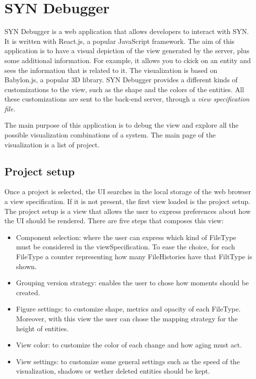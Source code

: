 \section{SYN Debugger}

SYN Debugger is a web application that allows developers to interact with SYN. It is written with React.js, a popular JavaScript framework. 
The aim of this application is to have a visual depiction of the view generated by the server, plus some additional information. 
For example, it allows you to ckick on an entity and sees the information that is related to it. 
The visualization is based on Babylon.js, a popular 3D library. 
SYN Debugger provides a different kinds of customizations to the view, such as the shape and the colors of the entities. 
All these customizations are sent to the back-end server, through a \it{view specification} file. 

The main purpose of this application is to debug the view and explore all the possible visualization combinations of a system.
The main page of the visualization is a list of project.

\subsection*{Project setup}
Once a project is selected, the UI searches in the local storage of the web browser a view specification. 
If it is not present, the first view loaded is the project setup.
The project setup is a view that allows the user to express preferences about how the UI should be rendered. 
There are five steps that composes this view:
\begin{itemize}
    \item Component selection: where the user can express which kind of FileType must be considered in the viewSpecification. 
    To ease the choice, for each FileType a counter representing how many FileHistories have that FiltType is shown. 
    \item Grouping version strategy: enables the user to chose how moments should be created.
    \item Figure settings: to customize shape, metrics and opacity of each FileType. Moreover, with this view the user can chose the mapping strategy for the height of entities. 
    \item View color: to customize the color of each change and how aging must act. 
    \item View settings: to customize some general settings such as the speed of the visualization, shadows or wether deleted entities should be kept. 
\end{itemize}

